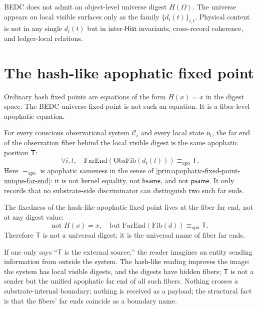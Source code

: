 \begin{principle}
\label{prin:hash-like-no-universe-digest}
BEDC does not admit an object-level universe digest $H(\Omega)$. The universe appears on local visible surfaces only as the family $\{d_i(t)\}_{i,t}$. Physical content is not in any single $d_i(t)$ but in inter-$\mathsf{Hist}$ invariants, cross-record coherence, and ledger-local relations.
\end{principle}

\section{The hash-like apophatic fixed point}
\label{sec:hash-like-fixed-point}

Ordinary hash fixed points are equations of the form $H(x) = x$ in the digest space. The BEDC universe-fixed-point is not such an equation. It is a fiber-level apophatic equation.

\begin{principle}
\label{prin:hash-like-apophatic-fixed-point}
For every conscious observational system $\mathcal{C}_i$ and every local state $\mathsf{o}_t$, the far end of the observation fiber behind the local visible digest is the same apophatic position $\mathsf{T}$:
$$
\forall i, t,\quad \mathrm{FarEnd}(\mathrm{ObsFib}(d_i(t))) \equiv_{\mathrm{apo}} \mathsf{T}.
$$
Here $\equiv_{\mathrm{apo}}$ is apophatic sameness in the sense of \autoref{prin:apophatic-fixed-point-unique-far-end}: it is not kernel equality, not $\mathsf{hsame}$, and not $\mathsf{psame}$. It only records that no substrate-side discriminator can distinguish two such far ends.
\end{principle}

\begin{principle}
\label{prin:hash-like-fiber-fixedness}
The fixedness of the hash-like apophatic fixed point lives at the fiber far end, not at any digest value:
$$
\text{not } H(x) = x, \quad \text{but } \mathrm{FarEnd}(\mathrm{Fib}(d)) \equiv_{\mathrm{apo}} \mathsf{T}.
$$
Therefore $\mathsf{T}$ is not a universal digest; it is the universal name of fiber far ends.
\end{principle}

\begin{remark}
\label{rem:hash-like-why-clarifies-T}
If one only says ``$\mathsf{T}$ is the external source,'' the reader imagines an entity sending information from outside the system. The hash-like reading improves the image: the system has local visible digests, and the digests have hidden fibers; $\mathsf{T}$ is not a sender but the unified apophatic far end of all such fibers. Nothing crosses a substrate-internal boundary; nothing is received as a payload; the structural fact is that the fibers' far ends coincide as a boundary name.
\end{remark}

